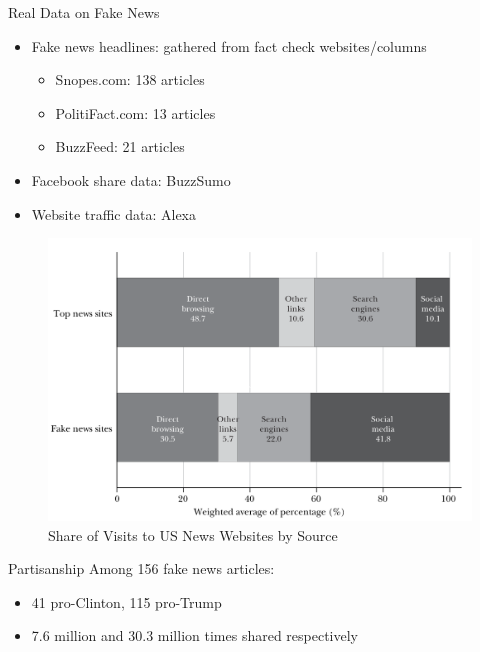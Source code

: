 \documentclass[
  10pt,
  ignorenonframetext,
  aspectratio=43,
]{beamer}
\providecommand{\tightlist}{%
  \setlength{\itemsep}{0pt}\setlength{\parskip}{0pt}}
\begin{document}
\begin{frame}{Real Data on Fake News}
\begin{itemize}
\tightlist
\item
  Fake news headlines: gathered from fact check websites/columns

  \begin{itemize}
  \tightlist
  \item
    Snopes.com: 138 articles
  \item
    PolitiFact.com: 13 articles
  \item
    BuzzFeed: 21 articles
  \end{itemize}
\item
  Facebook share data: BuzzSumo
\item
  Website traffic data: Alexa
\end{itemize}

\begin{block}{}
\protect\hypertarget{section}{}
\end{block}
\end{frame}

\begin{frame}
\begin{figure}
\centering
\includegraphics{20220315-allcott-gentzkow-2016-election-fake-news.assets/image-20220314203702283.png}
\caption{Share of Visits to US News Websites by Source}
\end{figure}
\end{frame}

\begin{frame}
\begin{block}{Partisanship}
\protect\hypertarget{partisanship}{}
Among 156 fake news articles:

\begin{itemize}
\tightlist
\item
  41 pro-Clinton, 115 pro-Trump
\item
  7.6 million and 30.3 million times shared respectively
\end{itemize}
\end{block}
\end{frame}
\end{document}
